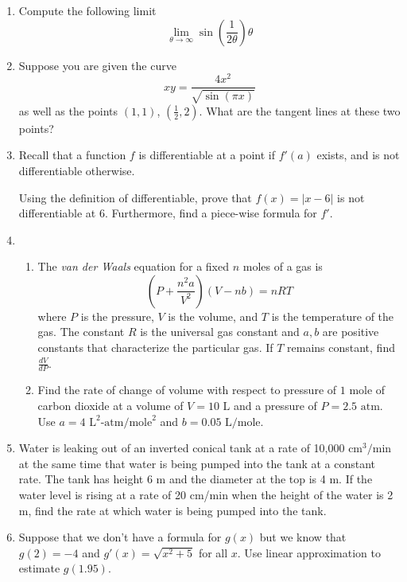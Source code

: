 \documentclass[letterpaper,11pt]{article}
\begin{document}
\begin{enumerate}
    \item Compute the following limit
    \[\lim_{\theta \to \infty} \sin\left(\frac{1}{2\theta}\right)\theta\]
    \newpage
    \item Suppose you are given the curve 
    \[xy = \frac{4x^2}{\sqrt{\sin(\pi x)}}\]
    as well as the points $(1,1)$, $(\frac{1}{2},2)$. What are the tangent lines at these two points?
    \newpage
    \item Recall that a function $f$ is differentiable at a point if $f'(a)$ exists, and is not differentiable otherwise. 
    
    Using the definition of differentiable, prove that $f(x) = |x-6|$ is not differentiable at 6. Furthermore, find a piece-wise formula for $f'$.
    \newpage
    \item
    \begin{enumerate}
        \item The \textit{van der Waals} equation for a fixed $n$ moles of a gas is 
        \[\left(P + \frac{n^2 a}{V^2}\right) (V-nb) = nRT\]
        where $P$ is the pressure, $V$ is the volume, and $T$ is the temperature of the gas. The constant $R$ is the universal gas constant and $a,b$ are positive constants that characterize the particular gas. If $T$ remains constant, find $\frac{dV}{dP}$.
        \vfill
        \item Find the rate of change of volume with respect to pressure of $1$ mole of carbon dioxide at a volume of $V = 10 \text{ L}$ and a pressure of $P = 2.5 \text{ atm}$. Use $a = 4 \text{ L}^2\text{-atm}/\text{mole}^2$ and $b = 0.05 \text{ L/mole}$.
        \vfill
    \end{enumerate}
    \newpage
    \item Water is leaking out of an inverted conical tank at a rate of 10,000 $\text{cm}^3/\text{min}$ at the same time that water is being pumped into the tank at a constant rate. The tank has height 6 m and the diameter at the top is 4 m. If the water level is rising at a rate of 20 cm/min when the height of the water is 2 m, find the rate at which water is being pumped into the tank.
    \newpage
    \item Suppose that we don't have a formula for $g(x)$ but we know that $g(2)=-4$ and $g'(x) = \sqrt{x^2 + 5}$ for all $x$. Use linear approximation to estimate $g(1.95)$.
\end{enumerate}
\end{document}
